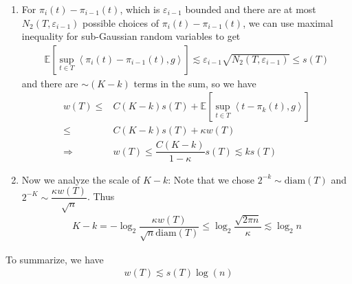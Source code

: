 \documentclass[11pt,a4paper]{ctexart}
\numberwithin{equation}{section}%
\begin{document}
\begin{enumerate}[topsep=2pt,itemsep=2pt]
    \item For $ \pi_i(t)-\pi_{i-1}(t) $, which is $ \varepsilon _{i-1} $ bounded and there are at most $ N_2(T,\varepsilon _{i-1}) $ possible choices of $ \pi_i(t)-\pi_{i-1}(t) $, we can use maximal inequality for sub-Gaussian random variables to get
    \begin{align*}
        \mathbb{E}\left[ \mathop{ \sup  }\limits_{t\in T} \left\langle \pi_i(t)-\pi_{i-1}(t),g \right\rangle  \right] \lesssim \varepsilon _{i-1}\sqrt{N_2(T,\varepsilon _{i-1})} \leq s(T)
    \end{align*}
    and there are $ \sim (K-k) $ terms in the sum, so we have
    \begin{align*}
        w(T)\leq& C(K-k)s(T) + \mathbb{E}\left[ \mathop{ \sup  }\limits_{t\in T} \left\langle t-\pi_k(t),g \right\rangle   \right] \\
        \leq & C(K-k)s(T) + \kappa w(T)\\
         \Rightarrow & w(T)\leq \dfrac{ C(K-k) }{ 1-\kappa }s(T) \lesssim ks(T)
    \end{align*}
    
    \item Now we analyze the scale of $ K-k $: Note that we chose $ 2^{-k}\sim \mathrm{ diam } (T)  $ and $ 2^{-K} \sim \dfrac{ \kappa w(T) }{ \sqrt{n} }  $. Thus
    \begin{align*}
        K-k = -\log_2 \dfrac{\kappa w(T) }{ \sqrt{n} \mathrm{ diam }(T)  } \leq \log_2 \dfrac{ \sqrt{2\pi n} }{ \kappa  }\lesssim \log_2 n  
    \end{align*}
\end{enumerate}

To summarize, we have
\begin{align*}
    w(T)\lesssim s(T)  \log(n) 
\end{align*}
\end{document}
